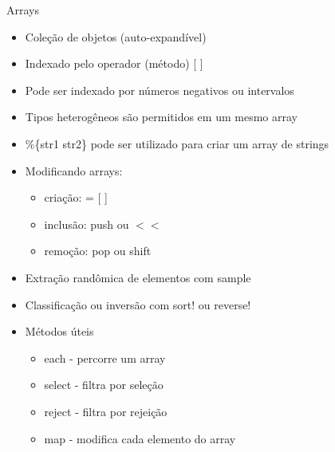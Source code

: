 
\begin{frame}{Arrays}
  \begin{itemize}
    \item Coleção de objetos (auto-expandível)
    \item Indexado pelo operador (método) \alert{[ ]}
    \item Pode ser indexado por números negativos ou intervalos
    \item Tipos heterogêneos são permitidos em um mesmo array
    \item \%\{str1 str2\} pode ser utilizado para criar um array de strings
  \end{itemize}
  
  
\pagebreak
  \begin{itemize}
    \item Modificando arrays:
    \begin{itemize}
      \item criação: \alert{= [ ]}
      \item inclusão: \alert{push} ou {$<<$}
      \item remoção: \alert{pop} ou {shift}
    \end{itemize}
    \item Extração randômica de elementos com \alert{sample}
    \item Classificação ou inversão com \alert{sort!} ou {reverse!}
  \end{itemize}  
  
  
  
\pagebreak
  \begin{itemize}
    \item Métodos úteis
    \begin{itemize}
      \item \alert{each} - percorre um array
      \item \alert{select} - filtra por seleção
      \item \alert{reject} - filtra por rejeição
      \item \alert{map} - modifica cada elemento do array
    \end{itemize}
  \end{itemize}  
  
  

\end{frame}

